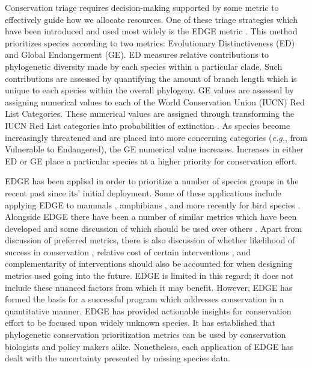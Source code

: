 \documentclass[12pt,english]{article}
\begin{document}
Conservation triage requires decision-making supported by some metric to
effectively guide how we allocate resources. One of these triage strategies
which have been introduced and used most widely is the EDGE metric
\autocite[Evolutionary Distinction and Globally Endangered;][]{Isaac2007}. This
method prioritizes species according to two metrics: Evolutionary
Distinctiveness (ED) and Global Endangerment (GE). ED measures relative
contributions to phylogenetic diversity made by each species within a particular
clade\autocite{Isaac2007}. Such contributions are assessed by quantifying the
amount of branch length which is unique to each species within the overall
phylogeny. GE values are assessed by assigning numerical values to each of the
World Conservation Union (IUCN) Red List Categories. These numerical values are
assigned through transforming the IUCN Red List categories into probabilities of
extinction \autocite{Mooers2008}. As species become increasingly threatened and
are placed into more concerning categories (\emph{e.g.}, from Vulnerable to
Endangered), the GE numerical value increases. Increases in either ED or GE
place a particular species at a higher priority for conservation effort.

EDGE has been applied in order to prioritize a number of species groups in the
recent past since its' initial deployment. Some of these applications include
applying EDGE to mammals \autocite{Isaac2007}, amphibians \autocite{Isaac2012},
and more recently for bird species \autocite{Jetz2014}. Alongside EDGE there
have been a number of similar metrics which have been developed and some
discussion of which should be used over others \autocite{Steel2007, Pearse2015}.
Apart from discussion of preferred metrics, there is also discussion of whether
likelihood of success in conservation \autocite{arg}, relative cost of certain
interventions \autocite{arg}, and complementarity of interventions
\autocite{arg} should also be accounted for when designing metrics used going
into the future. EDGE is limited in this regard; it does not include these
nuanced factors from which it may benefit. However, EDGE has formed the basis
for a successful program which addresses conservation in a quantitative manner.
EDGE has provided actionable insights for conservation effort to be focused upon
widely unknown species. It has established that phylogenetic conservation
prioritization metrics can be used by conservation biologists and policy makers
alike. Nonetheless, each application of EDGE has dealt with the uncertainty
presented by missing species data.
\end{document}
